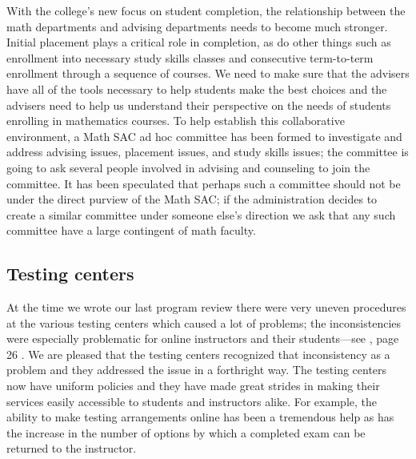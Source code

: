 With the college's new focus on student completion, the relationship between
the math departments and advising departments needs to become much stronger.
Initial placement plays a critical role in completion, as do other things such
as enrollment into necessary study skills classes and consecutive term-to-term
enrollment through a sequence of courses.  We need to make sure that the
advisers have all of the tools necessary to help students make the best choices
and the advisers need to help us understand their perspective on the needs of
students enrolling in mathematics courses.  To help establish this
collaborative environment, a Math SAC ad hoc committee has been formed to
investigate and address advising issues, placement issues, and study
skills issues;  the committee is going to ask several people involved in
advising and counseling to join the committee.  It has been speculated that
perhaps such a committee should not be under the direct purview of the Math
SAC; if the administration decides to create a similar committee under
someone else's direction we ask that any such committee have a large contingent
of math faculty.



\subsection{Testing centers}
At the time we wrote our last program review there were very uneven procedures
at the various testing centers which caused a lot of problems; the
inconsistencies were especially problematic for online instructors and their
students---see \cite{mathprogramreview2003}, page 26 .  We are pleased that the testing centers recognized that
inconsistency as a problem and they addressed the issue in a forthright way.
The testing centers now have uniform policies and they have made great strides
in making their services easily accessible to students and instructors alike.
For example, the ability to make testing arrangements online has been a
tremendous help as has the increase in the number of options by which a
completed exam can be returned to the instructor.

